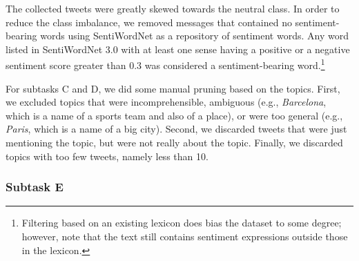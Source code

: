 \documentclass[11pt]{article}
\begin{document}
The collected tweets were greatly skewed towards the neutral class.
In order to reduce the class imbalance, we removed messages that contained no sentiment-bearing words using SentiWordNet as a repository of sentiment words.
Any word listed in SentiWordNet 3.0 with at least one sense having a positive or a negative sentiment score greater than 0.3 was considered a sentiment-bearing word.\footnote{Filtering based on an existing lexicon does bias the dataset to some degree; however, note that the text still contains sentiment expressions outside those in the lexicon.}


For subtasks C and D, we did some manual pruning based on the topics. First, we excluded topics that were incomprehensible, ambiguous (e.g., \emph{Barcelona}, which is a name of a sports team and also of a place), or were too general (e.g., \emph{Paris}, which is a name of a big city). Second, we discarded tweets that were just mentioning the topic, but were not really about the topic. Finally, we discarded topics with too few tweets, namely less than 10.


\subsubsection{Subtask E}
\end{document}
